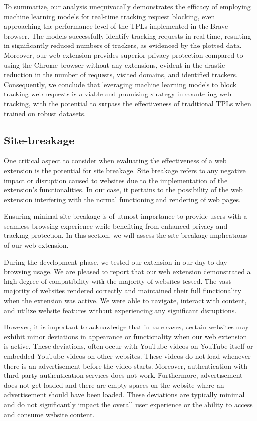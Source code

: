 To summarize, our analysis unequivocally demonstrates the efficacy of employing machine learning models for real-time tracking
request blocking, even approaching the performance level of the TPLs implemented in the Brave browser. The models successfully
identify tracking requests in real-time, resulting in significantly reduced numbers of trackers, as evidenced by the plotted data.
Moreover, our web extension provides superior privacy protection compared to using the Chrome browser without any extensions, evident
in the drastic reduction in the number of requests, visited domains, and identified trackers. Consequently, we conclude that leveraging
machine learning models to block tracking web requests is a viable and promising strategy in countering web tracking, with the potential
to surpass the effectiveness of traditional TPLs when trained on robust datasets.






\subsection{Site-breakage}
One critical aspect to consider when evaluating the effectiveness of a web extension is the potential for site breakage.
Site breakage refers to any negative impact or disruption caused to websites due to the implementation of the extension's
functionalities. In our case, it pertains to the possibility of the web extension interfering with the normal functioning
and rendering of web pages.

Ensuring minimal site breakage is of utmost importance to provide users with a seamless browsing experience while benefiting
from enhanced privacy and tracking protection. In this section, we will assess the site breakage implications of our web extension.

During the development phase, we tested our extension in our day-to-day browsing usage. We are pleased to report that our web
extension demonstrated a high degree of compatibility with the majority of websites tested.
The vast majority of websites rendered correctly and maintained their full functionality when the extension was active. We
were able to navigate, interact with content, and utilize website features without experiencing any significant disruptions.

However, it is important to acknowledge that in rare cases, certain websites may exhibit minor deviations in appearance or
functionality when our web extension is active. These deviations, often occur with YouTube videos on YouTube itself or embedded 
YouTube videos on other websites. These videos do not load whenever there is an advertisement before the video starts. Moreover, 
authentication with third-party authentication services does not work. Furthermore, advertisement does not get loaded and there are empty 
spaces on the website where an advertisement should have been loaded. These deviations are typically minimal and do not significantly impact
the overall user experience or the ability to access and consume website content.


